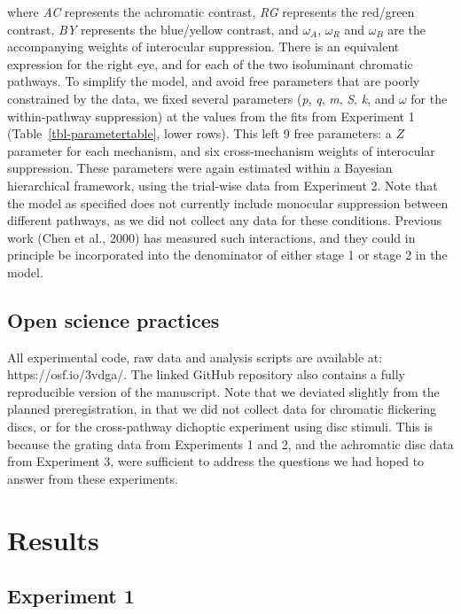 \documentclass[
  letterpaper,
  DIV=11,
  numbers=noendperiod]{scrartcl}
\begin{document}
where \emph{AC} represents the achromatic contrast, \emph{RG} represents
the red/green contrast, \emph{BY} represents the blue/yellow contrast,
and \(\omega_A\), \(\omega_R\) and \(\omega_B\) are the accompanying
weights of interocular suppression. There is an equivalent expression
for the right eye, and for each of the two isoluminant chromatic
pathways. To simplify the model, and avoid free parameters that are
poorly constrained by the data, we fixed several parameters (\emph{p},
\emph{q}, \emph{m}, \emph{S}, \emph{k}, and \(\omega\) for the
within-pathway suppression) at the values from the fits from Experiment
1 (Table~\ref{tbl-parametertable}, lower rows). This left 9 free
parameters: a \(Z\) parameter for each mechanism, and six
cross-mechanism weights of interocular suppression. These parameters
were again estimated within a Bayesian hierarchical framework, using the
trial-wise data from Experiment 2. Note that the model as specified does
not currently include monocular suppression between different pathways,
as we did not collect any data for these conditions. Previous work (Chen
et al., 2000) has measured such interactions, and they could in
principle be incorporated into the denominator of either stage 1 or
stage 2 in the model.

\hypertarget{open-science-practices}{%
\subsection{Open science practices}\label{open-science-practices}}

All experimental code, raw data and analysis scripts are available at:
https://osf.io/3vdga/. The linked GitHub repository also contains a
fully reproducible version of the manuscript. Note that we deviated
slightly from the planned preregistration, in that we did not collect
data for chromatic flickering discs, or for the cross-pathway dichoptic
experiment using disc stimuli. This is because the grating data from
Experiments 1 and 2, and the achromatic disc data from Experiment 3,
were sufficient to address the questions we had hoped to answer from
these experiments.

\hypertarget{results}{%
\section{Results}\label{results}}

\hypertarget{experiment-1}{%
\subsection{Experiment 1}\label{experiment-1}}
\end{document}
